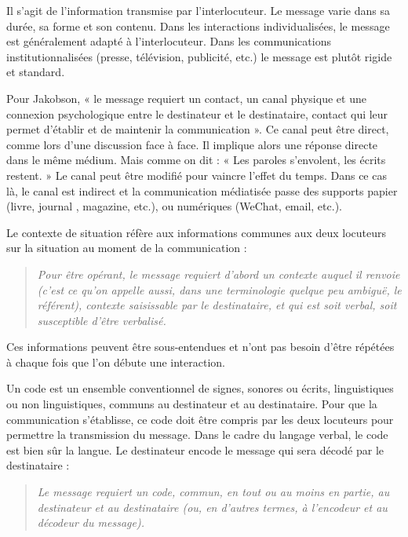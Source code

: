 Il s’agit de l’information transmise par l’interlocuteur. Le message varie dans sa durée, sa forme et son contenu. Dans les interactions individualisées, le message est généralement adapté à l’interlocuteur. Dans les communications institutionnalisées (presse, télévision, publicité, etc.) le message est plutôt rigide et standard.

Pour Jakobson, « le message requiert un contact, un canal physique et une connexion psychologique entre le destinateur et le destinataire, contact qui leur permet d’établir et de maintenir la communication ». Ce canal peut être direct, comme lors d’une discussion face à face. Il implique alors une réponse directe dans le même médium. Mais comme on dit : « Les paroles s’envolent, les écrits restent. » Le canal peut être modifié pour vaincre l’effet du temps. Dans ce cas là, le canal est indirect et la communication médiatisée passe des supports papier (livre, journal , magazine, etc.), ou numériques (WeChat, email, etc.).

Le contexte de situation réfère aux informations communes aux deux locuteurs sur la situation au moment de la communication :
\begin{quote}\small\itshape
Pour être opérant, le message requiert d’abord un contexte auquel il renvoie (c’est ce qu’on appelle aussi, dans une terminologie quelque peu ambiguë, le référent), contexte saisissable par le destinataire, et qui est soit verbal, soit susceptible d’être verbalisé.
\end{quote}
Ces informations peuvent être sous-entendues et n’ont pas besoin d’être répétées à chaque fois que l’on débute une interaction.

Un code est un ensemble conventionnel de signes, sonores ou écrits, linguistiques ou non linguistiques, communs au destinateur et au destinataire. Pour que la communication s’établisse, ce code doit être compris par les deux locuteurs pour permettre la transmission du message. Dans le cadre du langage verbal, le code est bien sûr la langue. Le destinateur encode le message qui sera décodé par le destinataire :
\begin{quote}\small\itshape
Le message requiert un code, commun, en tout ou au moins en partie, au destinateur et au destinataire (ou, en d’autres termes, à l’encodeur et au décodeur du message).
\end{quote}

